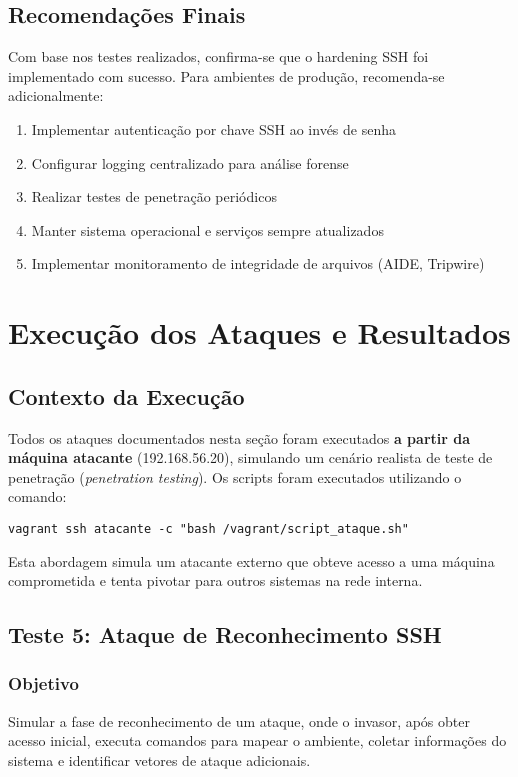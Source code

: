 \documentclass[12pt]{article}
\begin{document}
\subsection{Recomendações Finais}

Com base nos testes realizados, confirma-se que o hardening SSH foi implementado com sucesso. Para ambientes de produção, recomenda-se adicionalmente:
\begin{enumerate}
    \item Implementar autenticação por chave SSH ao invés de senha
    \item Configurar logging centralizado para análise forense
    \item Realizar testes de penetração periódicos
    \item Manter sistema operacional e serviços sempre atualizados
    \item Implementar monitoramento de integridade de arquivos (AIDE, Tripwire)
\end{enumerate}

\section{Execução dos Ataques e Resultados}

\subsection{Contexto da Execução}

Todos os ataques documentados nesta seção foram executados \textbf{a partir da máquina atacante} (192.168.56.20), simulando um cenário realista de teste de penetração (\emph{penetration testing}). Os scripts foram executados utilizando o comando:

\begin{verbatim}
vagrant ssh atacante -c "bash /vagrant/script_ataque.sh"
\end{verbatim}

Esta abordagem simula um atacante externo que obteve acesso a uma máquina comprometida e tenta pivotar para outros sistemas na rede interna.

\subsection{Teste 5: Ataque de Reconhecimento SSH}

\subsubsection{Objetivo}
Simular a fase de reconhecimento de um ataque, onde o invasor, após obter acesso inicial, executa comandos para mapear o ambiente, coletar informações do sistema e identificar vetores de ataque adicionais.
\end{document}
